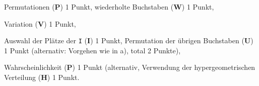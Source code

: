 \begin{bewertung}
\begin{teilaufgaben}
\item Permutationen ({\bf P}) 1 Punkt, wiederholte Buchstaben ({\bf W}) 1 Punkt,
\item Variation ({\bf V}) 1 Punkt,
\item Auswahl der Plätze der {\tt I} ({\bf I}) 1 Punkt, Permutation der
übrigen Buchstaben ({\bf U}) 1 Punkt (alternativ: Vorgehen wie in a),
total 2 Punkte),
\item Wahrscheinlichkeit ({\bf P}) 1 Punkt (alternativ, Verwendung
der hypergeometrischen Verteilung ({\bf H}) 1 Punkt.
\end{teilaufgaben}
\end{bewertung}



